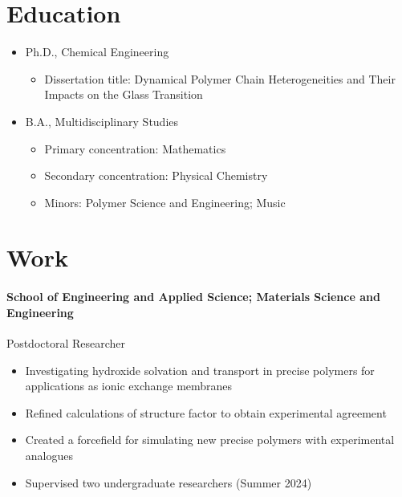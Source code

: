 \documentclass{my_cv}
\begin{document}

\section{Education}
\begin{itemize}
    \item Ph.D., Chemical Engineering
    \begin{itemize}
        \item Dissertation title: Dynamical Polymer Chain Heterogeneities and Their Impacts on the Glass Transition
    \end{itemize}
\end{itemize}
\begin{itemize}
    \item B.A., Multidisciplinary Studies
    \begin{itemize}
        \item Primary concentration: Mathematics
        \item Secondary concentration: Physical Chemistry
    \item Minors: Polymer Science and Engineering; Music
    \end{itemize}
\end{itemize}

\section{Work}
\paragraph{School of Engineering and Applied Science; Materials Science and Engineering\\}
Post\-doctoral Researcher
\begin{itemize}
    \item Investigating hydroxide solvation and transport in precise polymers for applications as ionic exchange membranes
    \item Refined calculations of structure factor to obtain experimental agreement
    \item Created a force\-field for simulating new precise polymers with experimental analogues
    \item Supervised two undergraduate researchers (Summer 2024)
\end{itemize}
\end{document}
